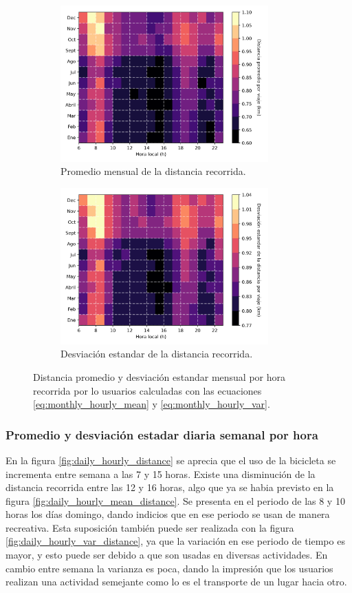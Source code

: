 \begin{figure}[H]
    \centering
    \begin{subfigure}[b]{8cm}
        \includegraphics[width=8cm]{Graphics/monthly_hourly_mean_distance.png}
        \caption{Promedio mensual de la distancia recorrida.}
        \label{fig:monthly_hourly_mean_distance}
    \end{subfigure}
    \begin{subfigure}[b]{8.5cm}
        \includegraphics[width=8cm]{Graphics/monthly_hourly_var_distance.png}
        \caption{Desviación estandar de la distancia recorrida.}
        \label{fig:monthly_hourly_var_distance}
    \end{subfigure}
    \caption{Distancia promedio y desviación estandar mensual por hora recorrida por lo usuarios calculadas con las ecuaciones \ref{eq:monthly_hourly_mean} y \ref{eq:monthly_hourly_var}.}
    \label{fig:monthly_hourly_distance}
\end{figure}

\subsubsection{Promedio y desviación estadar diaria semanal por hora}

En la figura \ref{fig:daily_hourly_distance} se aprecia que el uso de la bicicleta se incrementa entre semana a las 7 y 15 horas. Existe una disminución de la distancia recorrida entre las 12 y 16 horas, algo que ya se habia previsto en la figura \ref{fig:daily_hourly_mean_distance}. Se presenta en el periodo de las 8 y 10 horas los días domingo, dando indicios que en ese periodo se usan de manera recreativa. Esta suposición también puede ser realizada con la figura \ref{fig:daily_hourly_var_distance}, ya que la variación en ese periodo de tiempo es mayor, y esto puede ser debido a que son usadas en diversas actividades. En cambio entre semana la varianza es poca, dando la impresión que los usuarios realizan una actividad semejante como lo es el transporte de un lugar hacia otro.

